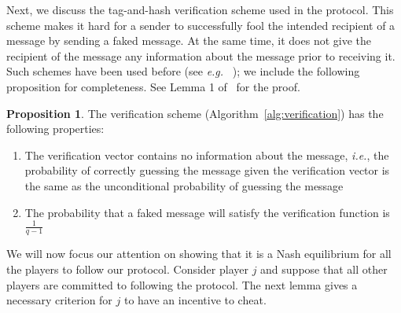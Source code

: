 \documentclass[12pt]{article}
\theoremstyle{definition}
\newtheorem{proposition}[theorem]{Proposition}
\newcommand{\ie}{\emph{i.e.}}
\newcommand{\eg}{\emph{e.g. }}
\begin{document}
Next, we discuss the tag-and-hash verification scheme used in the protocol. 
This scheme makes it hard for a sender to successfully fool the intended  
recipient of a message by sending a faked message. At the same time, it 
does not give the recipient of the message any information about the message 
prior to receiving it. Such schemes have been used before (see \eg 
~\cite{wegman1981new, rabin1989verifiable, kol2008games}); we include 
the following proposition for completeness.  See Lemma 1 of~\cite{rabin1989verifiable} for the proof.

\begin{proposition}\label{prop:hash}
The verification scheme (Algorithm~\ref{alg:verification}) has the following 
properties:
\begin{enumerate}
\item The verification vector contains no information about the message, \ie, 
the probability of correctly guessing the message given the verification 
vector is the same as the unconditional probability of guessing the message
\item The probability that a faked message will satisfy the verification 
function is $\frac{1}{q-1}$
\end{enumerate}
\end{proposition}









We will now focus our attention on showing that it is a Nash 
equilibrium for all the players to follow our protocol.   
Consider player $j$ and suppose that all other players are committed 
to following the protocol. The next lemma gives a necessary criterion 
for $j$ to have an incentive to cheat.
\end{document}
